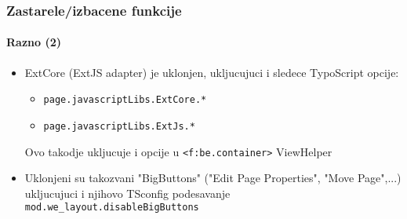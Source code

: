 \begin{frame}[fragile]
	\frametitle{Zastarele/izbacene funkcije}
	\framesubtitle{Razno (2)}

	\begin{itemize}

		\item ExtCore (ExtJS adapter) je uklonjen, ukljucujuci i sledece TypoScript opcije:

			\begin{itemize}
				\item \texttt{page.javascriptLibs.ExtCore.*}
				\item \texttt{page.javascriptLibs.ExtJs.*}
			\end{itemize}

			Ovo takodje ukljucuje i opcije u \texttt{<f:be.container>} ViewHelper

		\item Uklonjeni su takozvani "BigButtons" ("Edit Page Properties", "Move Page",...)
			ukljucujuci i njihovo TSconfig podesavanje \texttt{mod.we\_layout.disableBigButtons}

	\end{itemize}

\end{frame}


